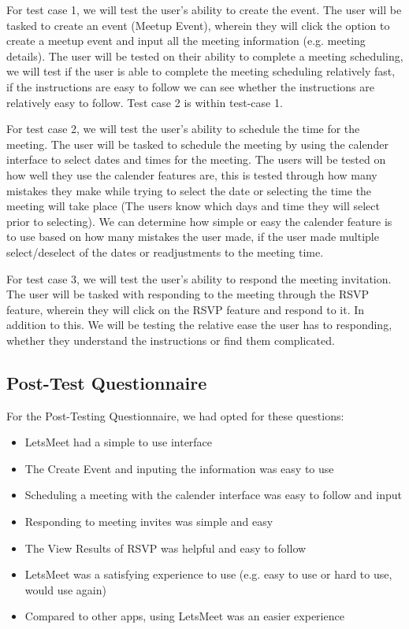 \documentclass{sigchi}
\begin{document}
For test case 1, we will test the user's ability to create the event. The user will be tasked to create an event (Meetup Event), wherein they will click the option to create a meetup event and input all the meeting information (e.g. meeting details). The user will be tested on their ability to complete a meeting scheduling, we will test if the user is able to complete the meeting scheduling relatively fast, if the instructions are easy to follow we can see whether the instructions are relatively easy to follow. Test case 2 is within test-case 1.

For test case 2, we will test the user's ability to schedule the time for the meeting. The user will be tasked to schedule the meeting by using the calender interface to select dates and times for the meeting. The users will be tested on how well they use the calender features are, this is tested through how many mistakes they make while trying to select the date or selecting the time the meeting will take place (The users know which days and time they will select prior to selecting). We can determine how simple or easy the calender feature is to use based on how many mistakes the user made, if the user made multiple select/deselect of the dates or readjustments to the meeting time.

For test case 3, we will test the user's ability to respond the meeting invitation. The user will be tasked with responding to the meeting through the RSVP feature, wherein they will click on the RSVP feature and respond to it. In addition to this. We will be testing the relative ease the user has to responding, whether they understand the instructions or find them complicated.

\subsection{Post-Test Questionnaire}

For the Post-Testing Questionnaire, we had opted for these questions:
\begin{itemize}
	\item LetsMeet had a simple to use interface
	\item The Create Event and inputing the information was easy to use
	\item Scheduling a meeting with the calender interface was easy to follow and input
	\item Responding to meeting invites was simple and easy
	\item The View Results of RSVP was helpful and easy to follow
	\item LetsMeet was a satisfying experience to use (e.g. easy to use or hard to use, would use again)
	\item Compared to other apps, using LetsMeet was an easier experience
\end{itemize}
\end{document}
